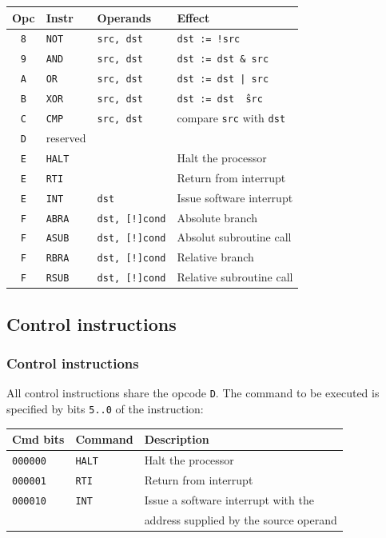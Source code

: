 \documentclass{beamer}
\begin{document}
   \begin{frame}
    \begin{center}
     \begin{tabular}{|c|ll|l|}
      \hline
       Opc&Instr&Operands&Effect\\
      \hline
       {\tt 8}&{\tt NOT}&{\tt src, dst}&{\tt dst := !src}\\
       {\tt 9}&{\tt AND}&{\tt src, dst}&{\tt dst := dst \& src}\\
       {\tt A}&{\tt OR}&{\tt src, dst}&{\tt dst := dst | src}\\
       {\tt B}&{\tt XOR}&{\tt src, dst}&{\tt dst := dst \^\ src}\\
       {\tt C}&{\tt CMP}&{\tt src, dst}&compare {\tt src} with {\tt dst}\\ 
       {\tt D}&reserved&\\
       {\tt E}&{\tt HALT}&&Halt the processor\\
       {\tt E}&{\tt RTI}&&Return from interrupt\\
       {\tt E}&{\tt INT}&\texttt{dst}&Issue software interrupt\\
       {\tt F}&{\tt ABRA}&{\tt dst, [!]cond}&Absolute branch\\
       {\tt F}&{\tt ASUB}&{\tt dst, [!]cond}&Absolut subroutine call\\
       {\tt F}&{\tt RBRA}&{\tt dst, [!]cond}&Relative branch\\
       {\tt F}&{\tt RSUB}&{\tt dst, [!]cond}&Relative subroutine call\\
      \hline
     \end{tabular}
    \end{center}
   \end{frame}
%
  \subsection{Control instructions}
   \begin{frame}
    \frametitle{Control instructions}
    All control instructions share the opcode \texttt{D}. The command to be
    executed is specified by bits \texttt{5..0} of the instruction:
    \begin{center}
     \begin{tabular}{|l|l|l|}
      \hline
       Cmd bits&Command&Description\\
      \hline
      \hline
       \texttt{000000}&\texttt{HALT}&Halt the processor\\
       \texttt{000001}&\texttt{RTI}&Return from interrupt\\
       \texttt{000010}&\texttt{INT}&Issue a software interrupt with the\\
        &&address supplied by the source operand\\
      \hline
     \end{tabular}
    \end{center}
   \end{frame}
%
\end{document}
